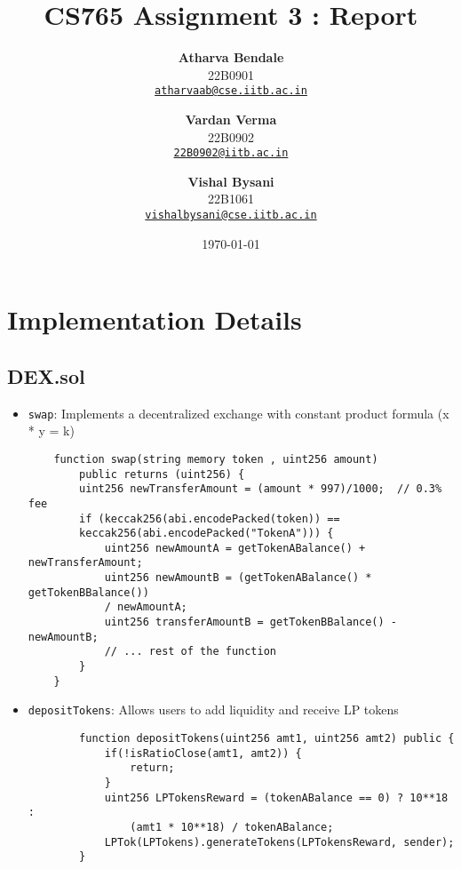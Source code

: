 \documentclass[12pt,a4paper]{article}
\title{\huge \bfseries CS765 Assignment 3 : Report}
\author{
    \textbf{Atharva Bendale} \\
    {\normalsize 22B0901} \\
    {\normalsize \href{mailto:atharvaab@cse.iitb.ac.in}{\texttt{atharvaab@cse.iitb.ac.in}}} \and
    \textbf{Vardan Verma}\\
    {\normalsize 22B0902}\\
    {\normalsize \href{mailto:22B0902@iitb.ac.in}{\texttt{22B0902@iitb.ac.in}}}\and    
    \textbf{Vishal Bysani} \\
    {\normalsize 22B1061} \\
    {\normalsize \href{mailto:vishalbysani@cse.iitb.ac.in}{\texttt{vishalbysani@cse.iitb.ac.in}}}
    }
\date{}
\date{\today}
\begin{document}
\maketitle

\section*{Implementation Details}

\subsection*{DEX.sol}
\begin{itemize}
    \item \texttt{swap}: Implements a decentralized exchange with constant product formula (x * y = k)
    \begin{listing}[H]
    \begin{verbatim}
    function swap(string memory token , uint256 amount) 
        public returns (uint256) {
        uint256 newTransferAmount = (amount * 997)/1000;  // 0.3% fee
        if (keccak256(abi.encodePacked(token)) == 
        keccak256(abi.encodePacked("TokenA"))) {
            uint256 newAmountA = getTokenABalance() + newTransferAmount;
            uint256 newAmountB = (getTokenABalance() * getTokenBBalance())
            / newAmountA;
            uint256 transferAmountB = getTokenBBalance() - newAmountB;
            // ... rest of the function
        }
    }
    \end{verbatim}
    \end{listing}

        \item \texttt{depositTokens}: Allows users to add liquidity and receive LP tokens
        \begin{listing}[H]
        \begin{verbatim}
        function depositTokens(uint256 amt1, uint256 amt2) public {
            if(!isRatioClose(amt1, amt2)) {
                return;
            }
            uint256 LPTokensReward = (tokenABalance == 0) ? 10**18 :  
                (amt1 * 10**18) / tokenABalance;
            LPTok(LPTokens).generateTokens(LPTokensReward, sender);
        }
        \end{verbatim}
        \end{listing}


\end{itemize}
\end{document}
